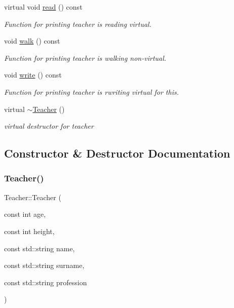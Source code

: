 \begin{DoxyCompactItemize}
\mbox{\label{classTeacher_ab889db1e7fdbffb5ce2f9b99a6ecc791}} 
virtual void \hyperlink{classTeacher_ab889db1e7fdbffb5ce2f9b99a6ecc791}{read} () const
\begin{DoxyCompactList}\small\item\em Function for printing teacher is reading virtual. \end{DoxyCompactList}\item 
\mbox{\label{classTeacher_ab0919f227d7782bf063463bb5f2ab98b}} 
void \hyperlink{classTeacher_ab0919f227d7782bf063463bb5f2ab98b}{walk} () const
\begin{DoxyCompactList}\small\item\em Function for printing teacher is walking non-\/virtual. \end{DoxyCompactList}\item 
\mbox{\label{classTeacher_acd12fa9aebd63f19083d34d91b79cc5f}} 
void \hyperlink{classTeacher_acd12fa9aebd63f19083d34d91b79cc5f}{write} () const
\begin{DoxyCompactList}\small\item\em Function for printing teacher is rwriting virtual for this. \end{DoxyCompactList}\item 
\mbox{\label{classTeacher_a27e515506e87deffe0cb21e26c4df90c}} 
virtual \hyperlink{classTeacher_a27e515506e87deffe0cb21e26c4df90c}{$\sim$\+Teacher} ()
\begin{DoxyCompactList}\small\item\em virtual destructor for teacher \end{DoxyCompactList}\end{DoxyCompactItemize}


\subsection{Constructor \& Destructor Documentation}
\mbox{\label{classTeacher_a8760a0c0903c3183f5b8a8a7439a9fe0}} 
\subsubsection{\texorpdfstring{Teacher()}{Teacher()}\hspace{0.1cm}{\footnotesize\ttfamily [1/2]}}
{\footnotesize\ttfamily Teacher\+::\+Teacher (\begin{DoxyParamCaption}\item[{const int}]{age,  }\item[{const int}]{height,  }\item[{const std\+::string}]{name,  }\item[{const std\+::string}]{surname,  }\item[{const std\+::string}]{profession }\end{DoxyParamCaption})}



